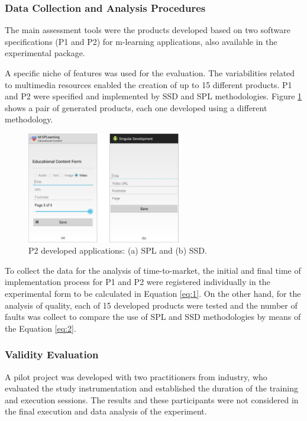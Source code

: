 \subsubsection*{Data Collection and Analysis Procedures}

The main assessment tools were the products developed based on two software specifications (P1 and P2) for m-learning applications, also available in the experimental package.


A specific niche of features was used for the evaluation. The variabilities related to multimedia resources enabled the creation of up to 15 different products. P1 and P2 were specified and implemented by SSD and SPL methodologies. Figure \ref{fig:prod} shows a pair of generated products, each one developed using a different methodology.

\begin{figure}[!htbp]
\centering
\includegraphics[width=0.6\textwidth]{MSPLGeneratedProducts.png}
\centering
\caption{P2 developed applications: (a) SPL and (b) SSD.}
\label{fig:prod}
\end{figure}


To collect the data for the analysis of time-to-market, the initial and final time of implementation process for P1 and P2 were registered individually in the experimental form to be calculated in Equation \ref{eq:1}. On the other hand, for the analysis of quality, each of 15 developed products were tested and the number of faults was collect to compare the use of SPL and SSD methodologies by means of the Equation \ref{eq:2}.

\subsubsection*{Validity Evaluation}

A pilot project was developed with two practitioners from industry, who evaluated the study instrumentation and established the duration of the training and execution sessions. The results and these participants were not considered in the final execution and data analysis of the experiment.

